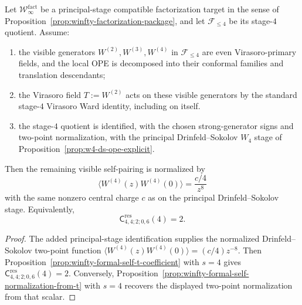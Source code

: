 \begin{proposition}
\label{prop:winfty-stage4-visible-diagonal-normalization}
\ClaimStatusConditional{}
Let $\mathcal{W}^{\mathrm{fact}}_\infty$ be a principal-stage
compatible factorization target in the sense of
Proposition~\ref{prop:winfty-factorization-package}, and let
$\mathcal{F}_{\le 4}$ be its stage-$4$ quotient. Assume:
\begin{enumerate}[label=\textup{(\roman*)}]
\item the visible generators $W^{(2)},W^{(3)},W^{(4)}$ in
 $\mathcal{F}_{\le 4}$ are even Virasoro-primary fields, and the local
 OPE is decomposed into their conformal families and translation
 descendants;
\item the Virasoro field $T:=W^{(2)}$ acts on these visible generators
 by the standard stage-$4$ Virasoro Ward identity, including on
 itself.
\item the stage-$4$ quotient is identified, with the chosen
 strong-generator signs and two-point normalization, with the
 principal Drinfeld--Sokolov $W_4$ stage of
 Proposition~\ref{prop:w4-ds-ope-explicit}.
\end{enumerate}
Then the remaining visible self-pairing is normalized by
\[
\langle W^{(4)}(z)W^{(4)}(0)\rangle = \frac{c/4}{z^{8}}
\]
with the same nonzero central charge $c$ as on the principal
Drinfeld--Sokolov stage. Equivalently,
\[
\mathsf{C}^{\mathrm{res}}_{4,4;2;0,6}(4)=2.
\]
\end{proposition}

\begin{proof}
The added principal-stage identification supplies the normalized
Drinfeld--Sokolov two-point function
$\langle W^{(4)}(z)W^{(4)}(0)\rangle=(c/4)z^{-8}$. Then
Proposition~\ref{prop:winfty-formal-self-t-coefficient} with $s=4$
gives
$\mathsf{C}^{\mathrm{res}}_{4,4;2;0,6}(4)=2$. Conversely,
Proposition~\ref{prop:winfty-formal-self-normalization-from-t} with
$s=4$ recovers the displayed two-point normalization from that scalar.
\end{proof}

